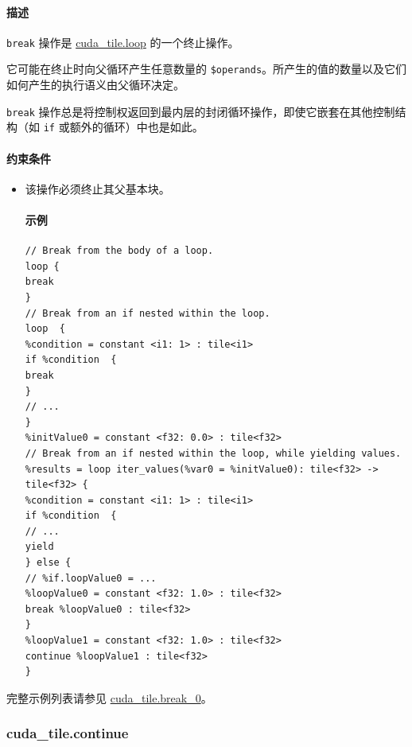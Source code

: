 \documentclass{article}
\begin{document}
\paragraph{描述}

\texttt{break} 操作是 \href{https://docs.nvidia.com/cuda/tile-ir/latest/sections/operations.html#op-cuda-tile-loop}{cuda\_tile.loop} 的一个终止操作。


它可能在终止时向父循环产生任意数量的 \texttt{\$operands}。所产生的值的数量以及它们如何产生的执行语义由父循环决定。


\texttt{break} 操作总是将控制权返回到最内层的封闭循环操作，即使它嵌套在其他控制结构（如 \texttt{if} 或额外的循环）中也是如此。



\paragraph{约束条件}

\begin{itemize}
\item 该操作必须终止其父基本块。


\paragraph{示例}

\begin{lstlisting}
// Break from the body of a loop.
loop {
break
}
// Break from an if nested within the loop.
loop  {
%condition = constant <i1: 1> : tile<i1>
if %condition  {
break
}
// ...
}
%initValue0 = constant <f32: 0.0> : tile<f32>
// Break from an if nested within the loop, while yielding values.
%results = loop iter_values(%var0 = %initValue0): tile<f32> -> tile<f32> {
%condition = constant <i1: 1> : tile<i1>
if %condition  {
// ...
yield
} else {
// %if.loopValue0 = ...
%loopValue0 = constant <f32: 1.0> : tile<f32>
break %loopValue0 : tile<f32>
}
%loopValue1 = constant <f32: 1.0> : tile<f32>
continue %loopValue1 : tile<f32>
}
\end{lstlisting}

\end{itemize}
完整示例列表请参见 \href{https://docs.nvidia.com/cuda/tile-ir/latest/sections/appendix.html#example-cuda-tile-break-0}{cuda\_tile.break\_0}。



\subsubsection{cuda\_tile.continue}
\end{document}
